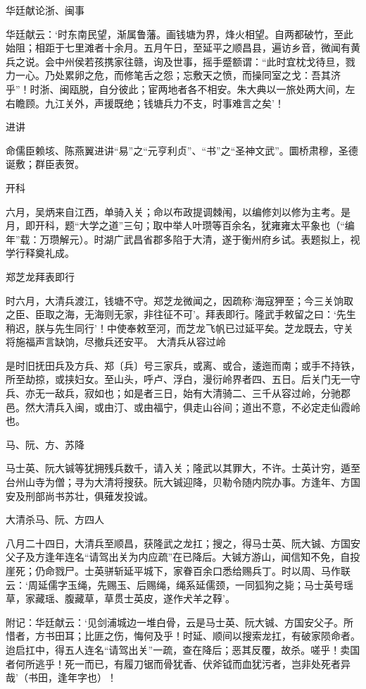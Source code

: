\documentclass[]{article}
\begin{document}
华廷献论浙、闽事

华廷献云：`时东南民望，渐属鲁藩。画钱塘为界，烽火相望。自两都破竹，至此始阻；相距于七里滩者十余月。五月午日，至延平之顺昌县，遍访乡音，微闻有黄兵之说。会中州侯若孩携家往赣，询及世事，摇手蹙额谓：``此时宜枕戈待旦，戮力一心。乃处累卵之危，而修笔舌之怨；忘敷天之愤，而操同室之戈：吾其济乎''！时浙、闽瓯脱，自分彼此；宦两地者各不相安。朱大典以一旅处两大间，左右瞻顾。九江关外，声援既绝；钱塘兵力不支，时事难言之矣'！

进讲

命儒臣赖垓、陈燕翼进讲``易''之``元亨利贞''、``书''之``圣神文武''。圜桥肃穆，圣德诞敷；群臣表贺。

开科

六月，吴炳来自江西，单骑入关；命以布政提调棘闱，以编修刘以修为主考。是月，即开科，题``大学之道''三句；取中举人叶瓒等百余名，犹雍雍太平象也（``编年''载：万瓒解元）。时湖广武昌省郡多陷于大清，遂于衡州府乡试。表题拟上，视学行释奠礼成。

郑芝龙拜表即行

时六月，大清兵渡江，钱塘不守。郑芝龙微闻之，因疏称`海寇狎至；今三关饷取之臣、臣取之海，无海则无家，非往征不可'。拜表即行。隆武手敕留之曰：`先生稍迟，朕与先生同行'！中使奉敕至河，而芝龙飞帆已过延平矣。芝龙既去，守关将施福声言缺饷，尽撤兵还安平。
大清兵从容过岭

是时旧抚田兵及方兵、郑〔兵〕号三家兵，或离、或合，逶迤而南；或手不持铁，所至劫掠，或挟妇女。至山头，呼卢、浮白，漫衍岭界者四、五日。后关门无一守兵、亦无一敌兵，寂如也；如是者三日，始有大清骑二、三千从容过岭，分驰郡邑。然大清兵入闽，或由汀、或由福宁，俱走山谷间；道出不意，不必定走仙霞岭也。

马、阮、方、苏降

马士英、阮大铖等犹拥残兵数千，请入关；隆武以其罪大，不许。士英计穷，遁至台州山寺为僧；寻为大清将搜获。阮大铖迎降，贝勒令随内院办事。方逢年、方国安及刑部尚书苏壮，俱薙发投诚。

大清杀马、阮、方四人

八月二十四日，大清兵至顺昌，获隆武之龙扛；搜之，得马士英、阮大铖、方国安父子及方逢年连名``请驾出关为内应疏''在已降后。大铖方游山，闻信知不免，自投崖死；仍命戮尸。士英骈斩延平城下，家眷百余口悉给赐兵丁。时以周、马作联云：`周延儒字玉绳，先赐玉、后赐绳，绳系延儒颈，一同狐狗之毙；马士英号瑶草，家藏瑶、腹藏草，草贯士英皮，遂作犬羊之鞟'。

附记：华廷献云：`见剑浦城边一堆白骨，云是马士英、阮大铖、方国安父子。所惜者，方书田耳；比匪之伤，悔何及乎！时延、顺间以搜索龙扛，有破家陨命者。迨启扛中，得五人连名``请驾出关''一疏，查在降后；恶其反覆，故杀。嗟乎！卖国者何所逃乎！死一而已，有履刀锯而骨犹香、伏斧钺而血犹污者，岂非处死者异哉'（书田，逢年字也）！
\end{document}
